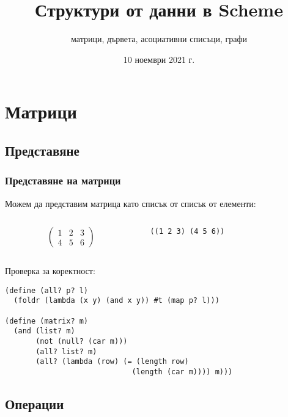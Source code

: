 \documentclass[alsotrans]{beamerswitch}
\title{Структури от данни в Scheme}
\subtitle{матрици, дървета, асоциативни списъци, графи}
\date{10 ноември 2021 г.}
\begin{document}
\begin{frame}
  \titlepage
\end{frame}

\section{Матрици}

\subsection{Представяне}

\begin{frame}[fragile]
  \frametitle{Представяне на матрици}
  Можем да представим матрица като списък от списък от елементи:\\
  \begin{columns}[T,onlytextwidth]
    \begin{column}{0.5\textwidth}
      \begin{equation*}
        \left(
          \begin{array}{ccc}
            1 & 2 & 3\\
            4 & 5 & 6
          \end{array}
        \right)
      \end{equation*}
    \end{column}
    \begin{column}{0.5\textwidth}
      \vspace{2ex}
      \tt{((1 2 3) (4 5 6))}
    \end{column}
  \end{columns}
  \vspace{2ex}
  \pause
  Проверка за коректност:
  \pause
\begin{lstlisting}
(define (all? p? l)
  (foldr (lambda (x y) (and x y)) #t (map p? l)))

(define (matrix? m)
  (and (list? m)
       (not (null? (car m)))
       (all? list? m)
       (all? (lambda (row) (= (length row)
                             (length (car m)))) m)))
\end{lstlisting}
\end{frame}

\subsection{Операции}
\end{document}
